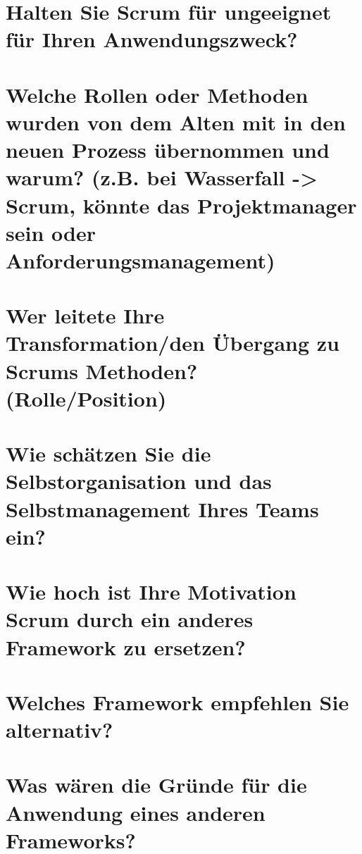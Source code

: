 \section*{Halten Sie Scrum für ungeeignet für Ihren Anwendungszweck?}

\section*{Welche Rollen oder Methoden wurden von dem Alten mit in den neuen Prozess übernommen und warum? (z.B. bei Wasserfall -> Scrum, könnte das Projektmanager sein oder Anforderungsmanagement)}
\langantwort

\section*{Wer leitete Ihre Transformation/den Übergang zu Scrums Methoden? (Rolle/Position)}
\langantwort

\section*{Wie schätzen Sie die Selbstorganisation und das Selbstmanagement Ihres Teams ein?}

\section*{Wie hoch ist Ihre Motivation Scrum durch ein anderes Framework zu ersetzen?}

\section*{Welches Framework empfehlen Sie alternativ?}
\kurzantwort

\section*{Was wären die Gründe für die Anwendung eines anderen Frameworks?}

